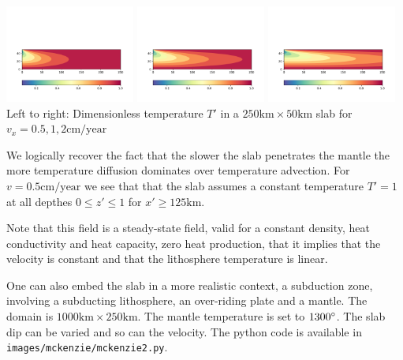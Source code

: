\begin{center}
\includegraphics[width=0.32\textwidth]{images/mckenzie/temperature_vel0p5.pdf}
\includegraphics[width=0.32\textwidth]{images/mckenzie/temperature_vel1.pdf}
\includegraphics[width=0.32\textwidth]{images/mckenzie/temperature_vel2.pdf}\\
{\captionfont Left to right: Dimensionless temperature $T'$ in a $250\text{km}\times 50\text{km}$ slab 
for $v_x={0.5,1,2}\text{cm/year}$}
\end{center}

We logically recover the fact that the slower the slab penetrates the mantle the more 
temperature diffusion dominates over temperature advection. For $v=0.5\text{cm/year}$ we see that 
that the slab assumes a constant temperature $T'=1$ at all depthes $0\leq z' \leq 1$ for 
$x'\geq 125\text{km}$. 

Note that this field is a steady-state field, valid for a constant density, heat conductivity and 
heat capacity, zero heat production, that it implies that the velocity is constant and that the 
lithosphere temperature is linear. 

One can also embed the slab in a more realistic context, a subduction zone, involving a 
subducting lithosphere, an over-riding plate and a mantle. The domain is $1000\text{km}\times 250\text{km}$.
The mantle temperature is set to $1300\degree$. The slab dip can be varied and so can the 
velocity. The python code is available in {\tt images/mckenzie/mckenzie2.py}.

